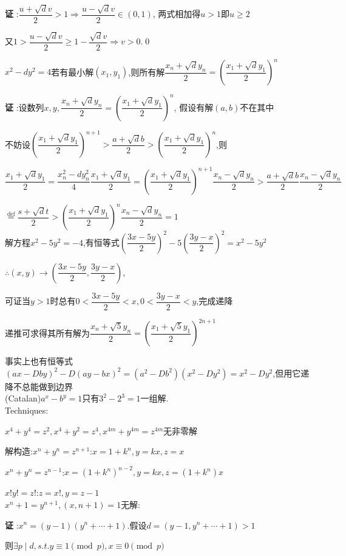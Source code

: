 {\bf 证 }:$ \dfrac{u+\sqrt{d}v}{2}>1\Rightarrow \dfrac{u-\sqrt{d}v}{2}\in(0,1)$,
两式相加得$ u>1$即$ u\ge 2$

又$ 1>\dfrac{u-\sqrt{d}v}{2}\ge 1-\dfrac{\sqrt{d}v}{2}\Rightarrow v>0$.\qed

$ x^2-dy^2=4$若有最小解$ (x_1,y_1)$,则所有解$ \dfrac{x_n+\sqrt{d}y_n}{2}=(\dfrac{x_1+\sqrt{d}y_1}{2})^n$

{\bf 证 }:设数列$x,y, \dfrac{x_n+\sqrt{d}y_n}{2}=(\dfrac{x_1+\sqrt{d}y_1}{2})^n$,
假设有解$ (a,b)$不在其中

不妨设$ ( \dfrac{x_1+\sqrt{d}y_1}{2})^{n+1}>\dfrac{a+\sqrt{d}b}{2}>(\dfrac{x_1+\sqrt{d}y_1}{2})^n$,则

$   \dfrac{x_1+\sqrt{d}y_1}{2}=\dfrac{x_n^2-dy_n^2}{4}\dfrac{x_1+\sqrt{d}y_1}{2}=(\dfrac{x_1+\sqrt{d}y_1}{2})^{n+1}\dfrac{x_n-\sqrt{d}y_n}{2}>\dfrac{a+\sqrt{d}b}{2}\dfrac{x_n-\sqrt{d}y_n}{2} $ 

$  \overset{\text{def}}{=} \dfrac{s+\sqrt{d}t}{2}>(\dfrac{x_1+\sqrt{d}y_1}{2})^n\dfrac{x_n-\sqrt{d}y_n}{2}=1$ 
\\

解方程$ x^2-5y^2=-4$,有恒等式$ (\dfrac{3x-5y}{2})^2-5(\dfrac{3y-x}{2})^2=x^2-5y^2$

$ \therefore (x,y)\rightarrow (\dfrac{3x-5y}{2},\dfrac{3y-x}{2}),$

可证当$ y>1$时总有$ 0<\dfrac{3x-5y}{2}<x,0<\dfrac{3y-x}{2}<y$,完成递降

递推可求得其所有解为$ \dfrac{x_n+\sqrt{5}y_n}{2}=(\dfrac{x_1+\sqrt{5}y_1}{2})^{2n+1}$

事实上也有恒等式$ (ax-Dby)^2-D(ay-bx)^2=(a^2-Db^2)(x^2-Dy^2)=x^2-Dy^2$,但用它递降不总能做到边界
\\

(Catalan)$ a^x-b^y=1$只有$ 3^2-2^3=1$一组解.
\\

Techniques:

$ x^4+y^4=z^2 ,x^4+y^2=z^4, x^{4m}+y^{4m}=z^{4m} $无非零解

解构造:$ x^n+y^n=z^{n+1}$:$ x=1+k^n,y=kx,z=x$

$ x^n+y^n=z^{n-1}$:$ x=(1+k^n)^{n-2},y=kx,z=(1+k^n)x$ 

$ x!y!=z!$:$ z=x!,y=z-1$
\\

$ x^n+1=y^{n+1},(x,n+1)=1$无解:

{\bf 证 }:$ x^n=(y-1)(y^n+\cdots +1)$.假设$ d=(y-1,y^n+\cdots +1)>1$

则$ \exists p \mid d ,s.t.y \equiv 1 \pmod p ,x\equiv 0 \pmod p$

